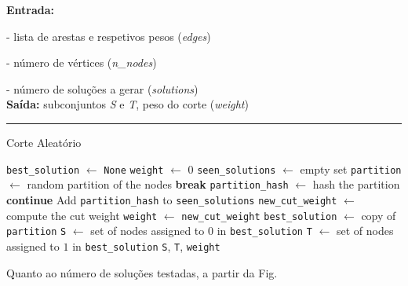 \documentclass[mirror, portugues]{revdetua}
\begin{document}
\begin{algorithm}[H]
\raggedright
\textbf{Entrada:}

- lista de arestas e respetivos pesos (\textit{edges})

- número de vértices (\textit{n\_nodes})

- número de soluções a gerar (\textit{solutions})\\
\textbf{Saída:} subconjuntos \textit{S} e \textit{T}, peso do corte (\textit{weight}) \\
\hrule 
\caption{Corte Aleatório}
\begin{algorithmic}[1]
    \State \texttt{best\_solution} $\gets$ \texttt{None}
    \State \texttt{weight} $\gets$ 0
    \State \texttt{seen\_solutions} $\gets$ empty set
        \State \texttt{partition} $\gets$ random partition of the nodes
            \State \textbf{break}
        \EndIf
        \State \texttt{partition\_hash} $\gets$ hash the partition
            \State \textbf{continue}
        \EndIf
        \State Add \texttt{partition\_hash} to \texttt{seen\_solutions}
        \State \texttt{new\_cut\_weight} $\gets$ compute the cut weight
            \State \texttt{weight} $\gets$ \texttt{new\_cut\_weight}
            \State \texttt{best\_solution} $\gets$ copy of \texttt{partition}
        \EndIf
    \EndFor
    \State \texttt{S} $\gets$ set of nodes assigned to $0$ in \texttt{best\_solution}
    \State \texttt{T} $\gets$ set of nodes assigned to $1$ in \texttt{best\_solution}
    \Return \texttt{S}, \texttt{T}, \texttt{weight}
\end{algorithmic}
\end{algorithm}
    


Quanto ao número de soluções testadas, a partir da Fig. 

\end{document}
